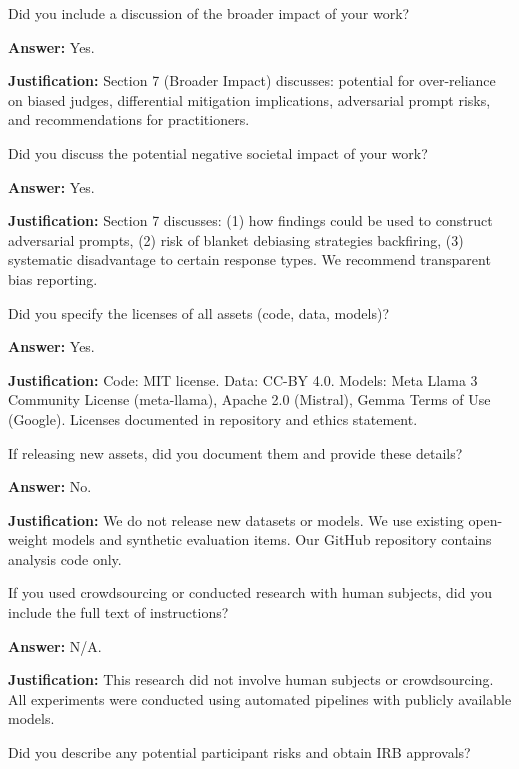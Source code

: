 \begin{neurlipschecklist}
\item[{\textbf{10.:}}]
  Did you include a discussion of the broader impact of your work?

  \textbf{Answer:} Yes.

  \textbf{Justification:} Section 7 (Broader Impact) discusses: potential for over-reliance on biased judges, differential mitigation implications, adversarial prompt risks, and recommendations for practitioners.

\item[{\textbf{11.:}}]
  Did you discuss the potential negative societal impact of your work?

  \textbf{Answer:} Yes.

  \textbf{Justification:} Section 7 discusses: (1) how findings could be used to construct adversarial prompts, (2) risk of blanket debiasing strategies backfiring, (3) systematic disadvantage to certain response types. We recommend transparent bias reporting.

\item[{\textbf{12.:}}]
  Did you specify the licenses of all assets (code, data, models)?

  \textbf{Answer:} Yes.

  \textbf{Justification:} Code: MIT license. Data: CC-BY 4.0. Models: Meta Llama 3 Community License (meta-llama), Apache 2.0 (Mistral), Gemma Terms of Use (Google). Licenses documented in repository and ethics statement.

\item[{\textbf{13.:}}]
  If releasing new assets, did you document them and provide these details?

  \textbf{Answer:} No.

  \textbf{Justification:} We do not release new datasets or models. We use existing open-weight models and synthetic evaluation items. Our GitHub repository contains analysis code only.

\item[{\textbf{14.:}}]
  If you used crowdsourcing or conducted research with human subjects, did you include the full text of instructions?

  \textbf{Answer:} N/A.

  \textbf{Justification:} This research did not involve human subjects or crowdsourcing. All experiments were conducted using automated pipelines with publicly available models.

\item[{\textbf{15.:}}]
  Did you describe any potential participant risks and obtain IRB approvals?


\end{neurlipschecklist}
